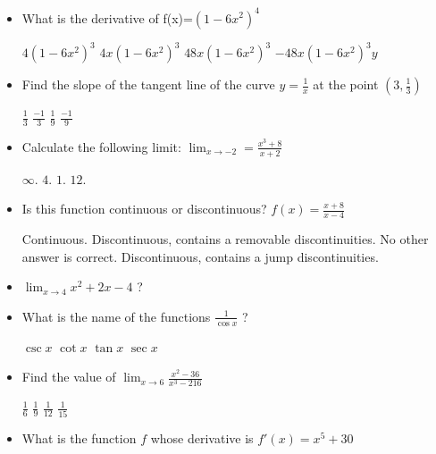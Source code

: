\documentclass{exam}
\begin{document}
\begin{itemize}
	\item What is the derivative of f(x)=$(1-6x^2)^4$
	\begin{choices}
		\choice $4(1-6x^2)^3$
		\choice $4x(1-6x^2)^3$
		\choice $48x(1-6x^2)^3$
		\CorrectChoice $-48x(1-6x^2)^3 y$
	\end{choices}

	\item Find the slope of the tangent line of the curve $y = \frac{1}{x}$ at the point $(3,\frac13)$

	\begin{choices}
		\choice $\frac{1}{3}$
		\choice $\frac{-1}{3}$
		\choice $\frac{1}{9}$
		\CorrectChoice $\frac{-1}{9}$
	\end{choices}

	\item Calculate the following limit: $\lim_{x \to -2} = \frac{x^3+8}{x+2}\ $

	\begin{choices}
		\choice $\infty$.
		\choice $4$.
		\choice $1$.
		\CorrectChoice $12$.
	\end{choices}
	\item  Is this function continuous or discontinuous? $f(x) = \frac{x+8}{x-4}$

	\begin{choices}
		\choice  Continuous.
		\choice Discontinuous, contains a removable discontinuities.
		\choice No other answer is correct.
		\CorrectChoice Discontinuous, contains a jump discontinuities.
	\end{choices}

	\item $\displaystyle \lim_{x\to 4}{x^{2} + 2 x - 4}$ ?

	\begin{choices}
		\choice 14
		\choice 16
		\choice 18
		\CorrectChoice 20
	\end{choices}

	\item What is the name of the functions $\frac1{\cos x}$ ?
	\begin{choices}
		\choice $\csc x$
		\choice $\cot x$
		\choice $\tan x$
		\CorrectChoice $\sec x$
	\end{choices}

	\item Find the value of $\displaystyle \lim_{x \to 6} \frac{x^2 -36}{x^3 -216}$

	\begin{choices}
		\choice $\frac{1}{6}$
		\CorrectChoice $\frac{1}{9}$
		\choice $\frac{1}{12}$
		\choice $\frac{1}{15}$
	\end{choices}
	\item What is the function $f$ whose derivative is $f'(x)=x^5 +30$


\end{itemize}
\end{document}
